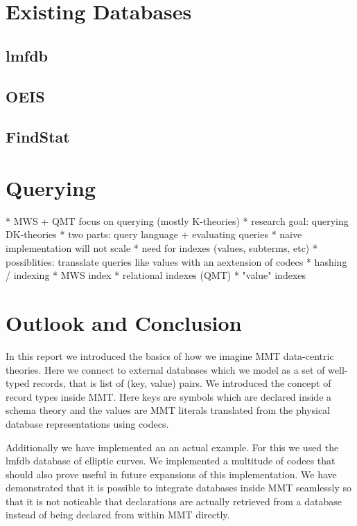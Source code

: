 \documentclass{deliverablereport}
\begin{document}

\section{Existing Databases}\label{sec:lmfdb}

\subsection{lmfdb}
\subsection{OEIS}
\subsection{FindStat}

\section{Querying}

* MWS + QMT focus on querying (mostly K-theories)
* research goal: querying DK-theories
  * two parts: query language + evaluating queries
  * naive implementation will not scale
  * need for indexes (values, subterms, etc)
  * possiblities: transslate queries like values with an aextension of codecs
  * hashing / indexing
    * MWS index
    * relational indexes (QMT)
    * "value" indexes

\section{Outlook and Conclusion}\label{sec:conclusion}

In this report we introduced the basics of how we imagine MMT data-centric theories. Here we connect to external databases which we model as a set of well-typed records, that is list of (key, value) pairs. We introduced the concept of record types inside MMT. Here keys are symbols which are declared inside a schema theory and the values are MMT literals translated from the physical database representations using codecs.

Additionally we have implemented an an actual example. For this we used the lmfdb database of elliptic curves. We implemented a multitude of codecs that should also prove useful in future expansions of this implementation. We have demonstrated that it is possible to integrate databases inside MMT seamlessly so that it is not noticable that declarations are actually retrieved from a database instead of being declared from within MMT directly.
\end{document}
